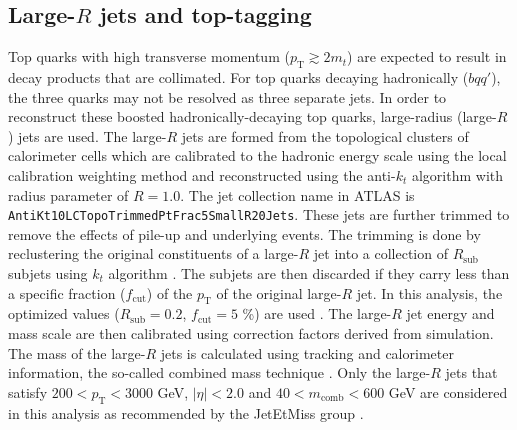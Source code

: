 \subsection{Large-$R$ jets and top-tagging}
\label{subsec:LargeJets}
Top quarks with high transverse momentum ($p_\text{T}\gtrsim2m_{t}$) are expected to result in decay products that are collimated. For top quarks decaying hadronically ($bqq'$), the three quarks may not be resolved as three separate jets. In order to reconstruct these boosted hadronically-decaying top quarks, large-radius (large-$R$) jets are used. The large-$R$ jets are formed from the topological clusters of calorimeter cells which are calibrated to the hadronic energy scale using the local calibration weighting method \cite{PERF-2014-07} and reconstructed using the anti-$k_t$ algorithm with radius parameter of $R=1.0$. The jet collection name in ATLAS is \texttt{AntiKt10LCTopoTrimmedPtFrac5SmallR20Jets}. These jets are further trimmed to remove the effects of pile-up and underlying events. The trimming \cite{D.Krohn:2010} is done by reclustering the original constituents of a large-$R$ jet into a collection of $R_\text{sub}$ subjets using $k_t$ algorithm \cite{S.Catani:1993}. The subjets are then discarded if they carry less than a specific fraction ($f_\text{cut}$) of the $p_\text{T}$ of the original large-$R$ jet. In this analysis, the optimized values ($R_\text{sub}=0.2$, $f_\text{cut}=5$ \%) are used \cite{PERF-2015-03}. The large-$R$ jet energy and mass scale are then calibrated using correction factors derived from simulation. The mass of the large-$R$ jets is calculated using tracking and calorimeter information, the so-called combined mass technique \cite{ATLAS-CONF-2016-035}. Only the large-$R$ jets that satisfy $200<p_\text{T}<3000$ GeV, $|\eta|<2.0$ and $40<m_\text{comb}<600$ GeV are considered in this analysis as recommended by the JetEtMiss group \cite{TwikiForLargeRJetUncert}.

